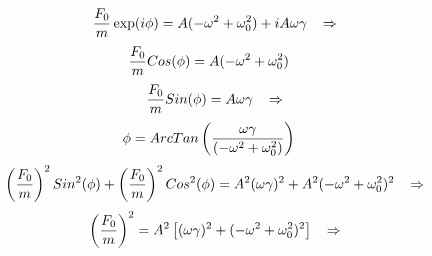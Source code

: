 \documentclass[a4paper]{article}
\begin{document}
\begin{answer}[Problema 5.]
\begin{enumerate}
\begin{equation*}
                \begin{split}
                    \frac{F_0}{m} \exp(i\phi)
                    &= A(-\omega^2  + \omega_0^2) + iA\omega\gamma\hspace{0.3cm} \Rightarrow\\
                \end{split}
            \end{equation*}
            \begin{equation*}
                \begin{split}
                    \frac{F_0}{m} Cos(\phi)
                    = A(-\omega^2  + \omega_0^2) \hspace{0.3cm}
                \end{split}
            \end{equation*}
            \begin{equation*}
                \begin{split}
                    \frac{F_0}{m} Sin(\phi)
                    &= A\omega\gamma\hspace{0.3cm} \Rightarrow\\
                \end{split}
            \end{equation*}
            \begin{equation*}
                \begin{split}
                    \phi
                    &=ArcTan\left(\frac{ \omega\gamma}{ (-\omega^2  + \omega_0^2)}\right)\hspace{0.3cm}\\
                \end{split}
            \end{equation*}
            \begin{equation*}
                \begin{split}
                    \left(\frac{F_0}{m}\right)^2 Sin^2(\phi) +  \left(\frac{F_0}{m}\right)^2 Cos^2(\phi)
                    &= A^2(\omega\gamma)^2+ A^2(-\omega^2  + \omega_0^2)^2\hspace{0.3cm} \Rightarrow\\
                \end{split}
            \end{equation*}
            \begin{equation*}
                \begin{split}
                    \left(\frac{F_0}{m}\right)^2
                    &= A^2\left[(\omega\gamma)^2+ (-\omega^2  + \omega_0^2)^2\right]\hspace{0.3cm} \Rightarrow\\

\end{split}
\end{equation*}
\end{enumerate}
\end{answer}
\end{document}
